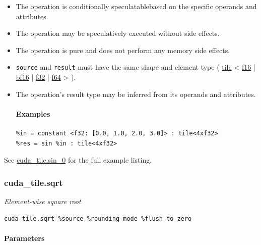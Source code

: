 \documentclass{article}
\begin{document}
\begin{itemize}
\item The operation is conditionally speculatablebased on the specific operands and attributes.
\item The operation may be speculatively executed without side effects.
\item The operation is pure and does not perform any memory side effects.
\item \texttt{source} and \texttt{result} must have the same shape and element type ( \href{https://docs.nvidia.com/cuda/tile-ir/latest/sections/types.html#type-tile}{tile} < \href{https://docs.nvidia.com/cuda/tile-ir/latest/sections/types.html#subsection-element-types}{f16} | \href{https://docs.nvidia.com/cuda/tile-ir/latest/sections/types.html#subsection-element-types}{bf16} | \href{https://docs.nvidia.com/cuda/tile-ir/latest/sections/types.html#subsection-element-types}{f32} | \href{https://docs.nvidia.com/cuda/tile-ir/latest/sections/types.html#subsection-element-types}{f64} > ).
\item The operation's result type may be inferred from its operands and attributes.


\paragraph{Examples}

\begin{lstlisting}
%in = constant <f32: [0.0, 1.0, 2.0, 3.0]> : tile<4xf32>
%res = sin %in : tile<4xf32>
\end{lstlisting}

\end{itemize}
See \href{https://docs.nvidia.com/cuda/tile-ir/latest/sections/appendix.html#example-cuda-tile-sin-0}{cuda\_tile.sin\_0} for the full example listing.



\subsubsection{cuda\_tile.sqrt}

\textit{Element-wise square root}


\begin{lstlisting}
cuda_tile.sqrt %source %rounding_mode %flush_to_zero
\end{lstlisting}

\paragraph{Parameters}
\end{document}
